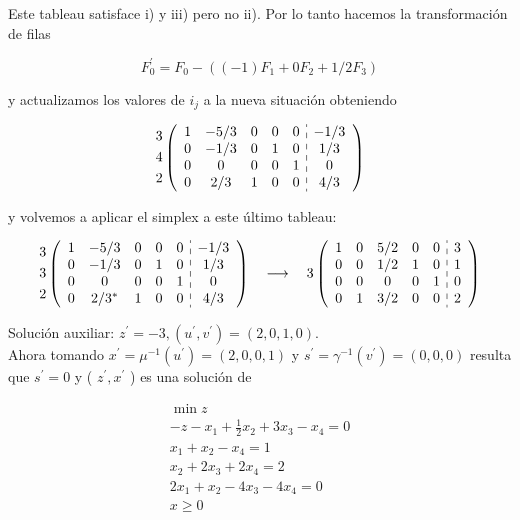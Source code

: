 \documentclass[10pt]{article}
\begin{document}
Este tableau satisface i) y iii) pero no ii). Por lo tanto hacemos la transformación de filas

$$
F_{0}^{\prime}=F_{0}-\left((-1) F_{1}+0 F_{2}+1 / 2 F_{3}\right)
$$

y actualizamos los valores de $i_{j}$ a la nueva situación obteniendo

$$
\begin{aligned}
& 3 \\
& 4 \\
& 2
\end{aligned}\left(\begin{array}{ccccc:c}
1 & -5 / 3 & 0 & 0 & 0 & -1 / 3 \\
0 & -1 / 3 & 0 & 1 & 0 & 1 / 3 \\
0 & 0 & 0 & 0 & 1 & 0 \\
0 & 2 / 3 & 1 & 0 & 0 & 4 / 3
\end{array}\right)
$$

y volvemos a aplicar el simplex a este último tableau:

$$
\begin{aligned}
& 3 \\
& 3 \\
& 2
\end{aligned}\left(\begin{array}{ccccc:c}
1 & -5 / 3 & 0 & 0 & 0 & -1 / 3 \\
0 & -1 / 3 & 0 & 1 & 0 & 1 / 3 \\
0 & 0 & 0 & 0 & 1 & 0 \\
0 & 2 / 3^{*} & 1 & 0 & 0 & 4 / 3
\end{array}\right) \quad \longrightarrow \quad \begin{gathered}
3\left(\begin{array}{ccccc:c}
1 & 0 & 5 / 2 & 0 & 0 & 3 \\
0 & 0 & 1 / 2 & 1 & 0 & 1 \\
0 & 0 & 0 & 0 & 1 & 0 \\
0 & 1 & 3 / 2 & 0 & 0 & 2
\end{array}\right)
\end{gathered}
$$

Solución auxiliar: $z^{\prime}=-3,\left(u^{\prime}, v^{\prime}\right)=(2,0,1,0)$.\\
Ahora tomando $x^{\prime}=\mu^{-1}\left(u^{\prime}\right)=(2,0,0,1)$ y $s^{\prime}=\gamma^{-1}\left(v^{\prime}\right)=(0,0,0)$ resulta que $s^{\prime}=0$ y ( $z^{\prime}, x^{\prime}$ ) es una solución de

$$
\begin{gathered}
\min z \\
-z-x_{1}+\frac{1}{2} x_{2}+3 x_{3}-x_{4}=0 \\
x_{1}+x_{2}-x_{4}=1 \\
x_{2}+2 x_{3}+2 x_{4}=2 \\
2 x_{1}+x_{2}-4 x_{3}-4 x_{4}=0 \\
x \geq 0
\end{gathered}
$$
\end{document}
